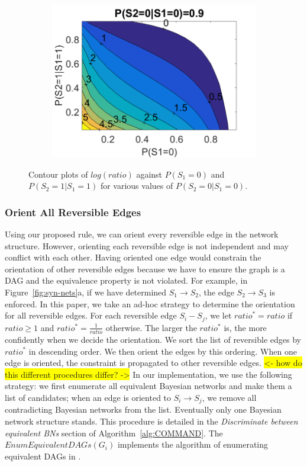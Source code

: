 \documentclass{edm_template}
\newcommand{\hl}[1]{\colorbox{yellow}{#1}}
\begin{document}
\begin{figure}[!ht]
\begin{subfigure}[t]{0.32\linewidth}
				\includegraphics[width=1.05\linewidth]{figures/contour3.png}
				\caption{\label{fig:contour3}}
			\end{subfigure}						
			\caption{Contour plots of $log(ratio)$ against $P(S_1=0)$ and $P(S_2=1|S_1=1)$ for various values of $P(S_2=0|S_1=0)$.\label{fig:contours} }
			\vspace{-1em}
		\end{figure}
		
\subsubsection{Orient All Reversible Edges}
Using our proposed rule, we can orient every reversible edge in the network structure. 
However, orienting each reversible edge is not independent and may conflict with each other.
Having oriented one edge would constrain the orientation of other reversible edges because we have to ensure the graph is a DAG and the equivalence property is not violated.
For example, in Figure~\ref{fig:syn-nets}a, if we have determined $S_1\rightarrow S_2$, the edge $S_2\rightarrow S_3$ is enforced.
In this paper, we take an ad-hoc strategy to determine the orientation for all reversible edges. 
For each reversible edge $S_i-S_j$, we let $ratio^*=ratio$ if $ratio \ge 1$ and $ratio^*=\frac{1}{ratio}$ otherwise. 
The larger the $ratio^*$ is, the more confidently when we decide the orientation.
We sort the list of reversible edges by $ratio^*$ in descending order. We then orient the edges by this ordering.
When one edge is oriented, the constraint is propagated to other reversible edges. 
\hl{<- how do this different procedures differ? ->}
In our implementation, we use the following strategy: 
we first enumerate all equivalent Bayesian networks and make them a list of candidates; 
when an edge is oriented to $S_i\rightarrow S_j$, we remove all contradicting Bayesian networks from the list.
Eventually only one Bayesian network structure stands. This procedure is detailed in the \emph{Discriminate between equivalent BNs} section of Algorithm~\ref{alg:COMMAND}.  
The $EnumEquivalentDAGs(G_i)$ implements the algorithm of enumerating equivalent DAGs in \cite{chen2014finding}.
\end{document}

